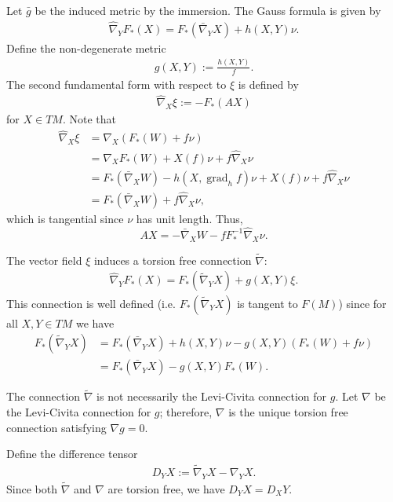 \documentclass{amsart}
\theoremstyle{definition}
\theoremstyle{remark}
\numberwithin{equation}{section}
\begin{document}
Let $\bar{g}$ be the induced metric by the immersion. The Gauss formula is given by
\begin{align}\label{gauss equ}
\hat{\nabla}_YF_{\ast}(X)=F_{\ast}(\bar{\nabla}_YX)+h(X,Y)\nu.
\end{align}
Define the non-degenerate metric
\begin{align}
g(X,Y):=\frac{h(X,Y)}{ f }.
\end{align}
The second fundamental form with respect to $\xi$ is defined by
\begin{align}
\hat{\nabla}_X\xi:=-F_{\ast}(AX)
\end{align}
for $X\in TM$. Note that
\begin{align*}
\hat{\nabla}_X \xi &= \hat{\nabla}_X (F_{\ast}(W) + f \nu) \\
&= \hat{\nabla}_X F_{\ast}(W) + X(f)\nu + f \hat{\nabla}_X \nu \\
&= F_{\ast}(\bar{\nabla}_X W) - h(X, \operatorname{grad}_h f) \nu + X(f) \nu + f \hat{\nabla}_X \nu \\
&= F_{\ast} (\bar{\nabla}_X W) + f \hat{\nabla}_X \nu,
\end{align*}
which is tangential since $\nu$ has unit length. Thus,
\[
AX =- \bar{\nabla}_X W - f F_{\ast}^{-1} \hat{\nabla}_X \nu.
\]

The vector field $\xi$ induces a torsion free connection $\tilde{\nabla}$:
\begin{align}\label{gauss equ2}
\hat{\nabla}_YF_{\ast}(X)=F_{\ast}(\tilde{\nabla}_YX)+g(X,Y)\xi.
\end{align}
This connection is well defined (i.e. $F_{\ast}(\tilde{\nabla}_Y X)$ is tangent to $F(M)$) since for all $X,Y\in TM$ we have
\begin{align}
F_{\ast}(\tilde{\nabla}_Y X) &= F_{\ast}(\bar{\nabla}_Y X) + h(X, Y) \nu - g(X, Y) (F_{\ast}(W) + f \nu) \\
&= F_{\ast}(\bar{\nabla}_YX)-g(X,Y)F_{\ast}(W) \nonumber.
\end{align}

The connection $\tilde{\nabla}$ is not necessarily the Levi-Civita connection for $g$. Let $\nabla$ be the Levi-Civita connection for $g$; therefore, $\nabla$ is the unique torsion free connection satisfying $\nabla g=0.$

Define the difference tensor
\begin{align*}
D_YX:=\tilde{\nabla}_{Y}X-\nabla_{Y}X.
\end{align*}
Since both $\tilde{\nabla}$ and $\nabla$ are torsion free, we have $D_YX=D_XY.$
\end{document}
